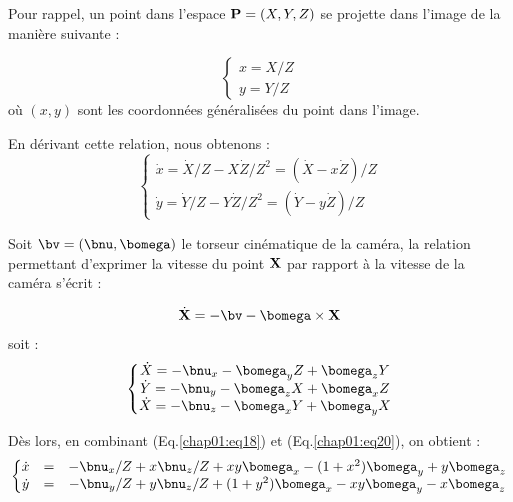 Pour rappel, un point dans l'espace ${\bf P} = (X, Y, Z)$ se projette dans 
l'image de la mani\`ere suivante :

\begin{equation}
\left \lbrace
\begin{matrix}
x = X/Z \\
y = Y/Z 
\end{matrix}
\right .
\label{chap01:eq17}
\end{equation}
o\`u $(x,y)$ sont les coordonn\'ees g\'en\'eralis\'ees du point dans l'image.

En d\'erivant cette relation, nous obtenons :
\begin{equation}
\left \lbrace
\begin{matrix}
\dot x = \dot X/Z - X \dot Z/Z^2  = (\dot X - x \dot Z)/Z \\
\dot y = \dot Y/Z - Y \dot Z/Z^2  = (\dot Y - y \dot Z)/Z 
\end{matrix}
\right .
\label{chap01:eq18}
\end{equation}

Soit $\bv = (\bnu, \bomega)$ le torseur cin\'ematique de la cam\'era, la 
relation permettant d'exprimer la vitesse du point ${\bf X}$ par rapport \`a la 
vitesse de la cam\'era s'\'ecrit :

\begin{equation}
\dot {\bf X} = -\bv - \bomega \times {\bf X}
\label{chap01:eq19}
\end{equation}
soit :
\begin{equation}
\left \lbrace
\begin{matrix}
\dot X = -\bnu_x - \bomega_y Z + \bomega_z Y \\
\dot Y = -\bnu_y - \bomega_z X + \bomega_x Z \\
\dot X = -\bnu_z - \bomega_x Y + \bomega_y X \\
\end{matrix}
\right .
\label{chap01:eq20}
\end{equation}

D\`es lors, en combinant (Eq.\ref{chap01:eq18}) et (Eq.\ref{chap01:eq20}), on 
obtient :
\begin{equation}
\left \lbrace
\begin{matrix}
\dot x &=& -\bnu_x/Z +x\bnu_z/Z + xy\bomega_x -(1+x^2)\bomega_y + y \bomega_z \\
\dot y &=& -\bnu_y/Z +y\bnu_z/Z + (1+y^2)\bomega_x -xy\bomega_y - x \bomega_z
\end{matrix}
\right .
\label{chap01:eq21}
\end{equation}


